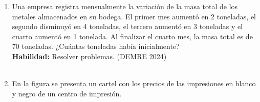 \documentclass[11pt,letterpaper]{article}
\newenvironment{alternativas}{%
\begin{enumerate}[label=\Alph*), leftmargin=14pt, itemsep=2pt, topsep=2pt]
}{\end{enumerate}}
\begin{document}
\begin{enumerate}[label=\textbf{\arabic*.}, leftmargin=*, itemsep=8pt, start=6]
\item
\begin{minipage}[t]{\linewidth}
Una empresa registra mensualmente la variación de la masa total de los metales almacenados en su bodega. El primer mes aumentó en 2 toneladas, el segundo disminuyó en 4 toneladas, el tercero aumentó en 3 toneladas y el cuarto aumentó en 1 tonelada. Al finalizar el cuarto mes, la masa total es de 70 toneladas. ¿Cuántas toneladas había inicialmente?\\
\textbf{Habilidad:} Resolver problemas. (DEMRE 2024)\\
\\%
\begin{minipage}{\linewidth}
\vspace{7mm}
\end{minipage}
\vspace{7mm}
\end{minipage}

\item
\begin{minipage}[t]{\linewidth}
En la figura se presenta un cartel con los precios de las impresiones en blanco y negro de un centro de impresión.\\


\end{minipage}
\end{enumerate}
\end{document}
